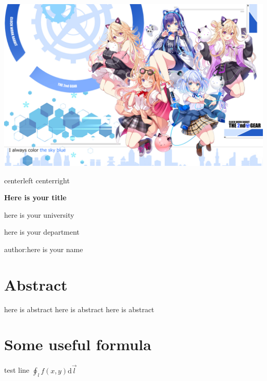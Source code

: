 \documentclass[12pt,a4paper]{report}
\newcommand{\customline}[4][center]{
    \noindent %
    \ifx#1left
        \makebox[0pt][l]{\textcolor{#4}{\rule{#2}{#3}}} %
    \else\ifx#1right
        \makebox[\textwidth][r]{\textcolor{#4}{\rule{#2}{#3}}} %
    \else
        \makebox[\textwidth]{\textcolor{#4}{\rule{#2}{#3}}} %
    \fi\fi
}
\begin{document}

\begin{titlepage}
  \centering
  \centerline{\includegraphics[width=\textwidth]{material/gochiusa_april2024.jpg}}%
  \customline[center]{\textwidth}{25pt}{definecolororeage} %
  \vspace*{1cm} %
   \begin{flushleft}
    \hspace*{2cm} 
    \begin{minipage}{\textwidth} 
        \Huge\textbf{\textrm{Here is your title}} 
        \vspace{1cm} 
        \par 
        \huge{here is your university} 
        \par 
        \huge{here is your department} 
    \end{minipage}
  \end{flushleft}
  \vfill
  \begin{flushleft}
    \hspace{2cm}
    \large{author:here is your name}
  \end{flushleft}
\end{titlepage}
\restoregeometry







\chapter*{Abstract}
here is abstract here is abstract here is abstract

\chapter*{Some useful formula}
test line $ \oint_{l} f(x,y) \textrm{d} \vec{l} $
\tableofcontents



\end{document}
